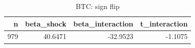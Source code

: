 \begin{table}
\caption{BTC: sign flip}
\label{tab:t7_sign_flip_BTC}
\begin{tabular}{rrrr}
\toprule
n & beta\_shock & beta\_interaction & t\_interaction \\
\midrule
979 & 40.6471 & -32.9523 & -1.1075 \\
\bottomrule
\end{tabular}
\end{table}

